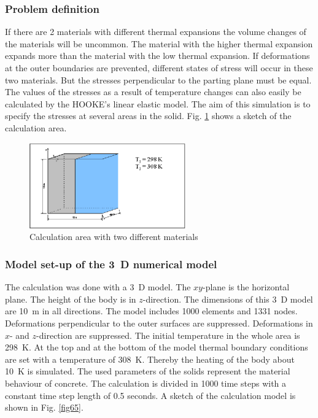 
\subsubsection{Problem definition}

If there are 2 materials with different thermal expansions the volume changes of the materials will be uncommon. The material with the higher thermal expansion expands more than the material with the low thermal expansion. If deformations at the outer boundaries are prevented, different states of stress will occur in these two materials. But the stresses perpendicular to the parting plane must be equal. The values of the stresses as a result of temperature changes can also easily be calculated by the HOOKE's linear elastic model. The aim of this simulation is to specify the stresses at several areas in the solid. Fig. \ref{fig64} shows a sketch of the calculation area.

\begin{figure}[htbp]
\centering
\includegraphics[width=0.6\textwidth]{TM/figures/fig64.eps}
\caption{Calculation area with two different materials}
\label{fig64}
\end{figure}


\subsubsection{Model set-up of the 3~D numerical model}

The calculation was done with a 3~D model. The $xy$-plane is the horizontal plane. The height of the body is in $z$-direction. The dimensions of this 3~D model are 10~m in all directions. The model includes 1000 elements and 1331 nodes. Deformations perpendicular to the outer surfaces are suppressed. Deformations in $x$- and $z$-direction are suppressed. The initial temperature in the whole area is 298~K. At the top and at the bottom of the model thermal boundary conditions are set with a temperature of 308~K. Thereby the heating of the body about 10~K is simulated. The used parameters of the solids represent the material behaviour of concrete. The calculation is divided in 1000 time steps with a constant time step length of 0.5 seconds. A sketch of the calculation model is shown in Fig. \ref{fig65}.

